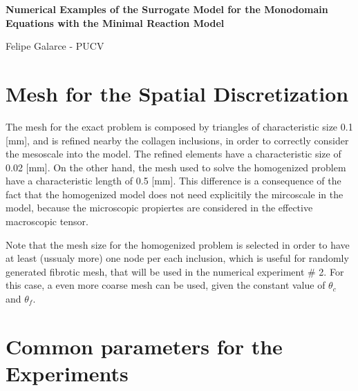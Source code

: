 \documentclass[letterpaper]{article} 			     	%
\begin{document}
\textbf{Numerical Examples of the Surrogate Model for the Monodomain Equations with the Minimal Reaction Model}

\small{Felipe Galarce - PUCV}

\section{Mesh for the Spatial Discretization}

The mesh for the exact problem is composed by triangles of characteristic size 0.1 [mm], and is refined nearby the collagen inclusions, in order to correctly consider the mesoscale into the model. The refined elements have a characteristic size of 0.02 [mm]. On the other hand, the mesh used to solve the homogenized problem have a characteristic length of 0.5 [mm]. This difference is a consequence of the fact that the homogenized model does not need explicitily the mircoscale in the model, because the microscopic propiertes are considered in the effective macroscopic tensor. 

Note that the mesh size for the homogenized problem is selected in order to have at least (ussualy more) one node per each inclusion, which is useful for randomly generated fibrotic mesh, that will be used in the numerical experiment \# 2. For this case, a even more coarse mesh can be used, given the constant value of $\theta_c$ and $\theta_f$.

\section{Common parameters for the Experiments}
\end{document}
